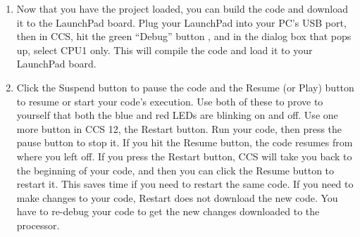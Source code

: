 \documentclass[11pt]{article}
\begin{document}
\begin{enumerate}
    \item Now that you have the project loaded, you can build the code and download it to the LaunchPad board. Plug your LaunchPad into your PC's USB port, then in CCS, hit the green “Debug” button \debugBtn, and in the dialog box that pops up, select CPU1 only. This will compile the code and load it to your LaunchPad board.
    \item Click the Suspend button \pauseBtn to pause the code and the Resume (or Play) button \playBtn to resume or start your code’s execution. Use both of these to prove to yourself that both the blue and red LEDs are blinking on and off. Use one more button in CCS 12, the Restart \restartBtn button. Run your code, then press the pause button to stop it. If you hit the Resume button, the code resumes from where you left off. If you press the Restart button, CCS will take you back to the beginning of your code, and then you can click the Resume button to restart it. This saves time if you need to restart the same code. If you need to make changes to your code, Restart does not download the new code. You have to re-debug your code to get the new changes downloaded to the processor.
\end{enumerate}
%
\end{document}
